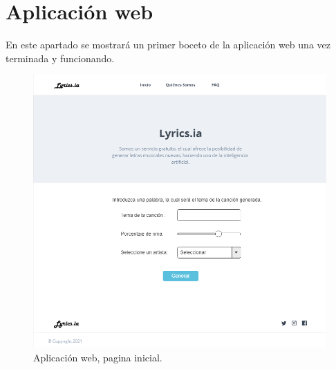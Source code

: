 \documentclass[12pt, a4paper, titlepage]{report}
\begin{document}
\section{Aplicación web}
En este apartado se mostrará un primer boceto de la aplicación web una vez terminada y funcionando.	        
\begin{figure}[H] \caption{Aplicación web, pagina inicial.}
	\includegraphics[width=12cm]{./imagenes/Analisis/MockFront.png}
	\centering 
\end{figure}
\end{document}
